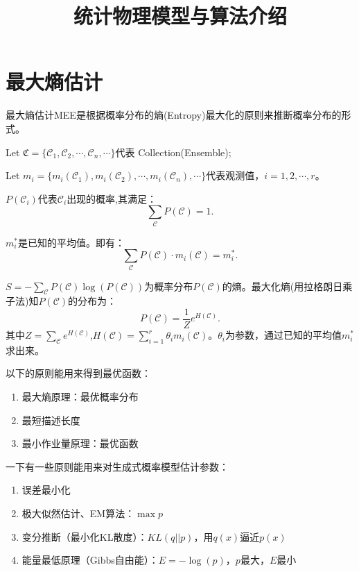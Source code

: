\documentclass[normal,cn, 11pt]{elegantnote}
\title { 统计物理模型与算法介绍 }
\date {}
\begin{document}
\maketitle

\section{最大熵估计}\label{sec:max-entro}
最大熵估计MEE是根据概率分布的熵(Entropy)最大化的原则来推断概率分布的形式。

Let $\mathfrak{C} = \{\mathcal{C}_1, \mathcal{C}_2, \cdots, \mathcal{C}_n, \cdots\}$代表 Collection(Ensemble);

Let $m_i = \{m_i(\mathcal{C}_1),m_i(\mathcal{C}_2), \cdots, m_i(\mathcal{C}_n), \cdots\}$代表观测值，$i = 1,2,\cdots,r$。

$P(\mathcal{C}_i)$代表$\mathcal{C}_i$出现的概率,其满足：
\begin{equation}\label{eq:p-sum}
  \sum\limits_{\mathcal{C}} P(\mathcal{C}) = 1.
\end{equation}

$m_i^\ast$是已知的平均值。即有：
\begin{equation}\label{eq:pingjun}
  \sum\limits_{\mathcal{C}} P(\mathcal{C})\cdot m_i(\mathcal{C}) =  m_i^\ast .
\end{equation}

$S = - \sum\limits_{\mathcal{C}}P(\mathcal{C})\log(P(\mathcal{C}))$为概率分布$P(\mathcal{C})$的熵。最大化熵(用拉格朗日乘子法)知$P(\mathcal{C})$的分布为：
\begin{equation}\label{eq:boltzmann}
  P(\mathcal{C}) = \frac{1}{Z} e^{H(\mathcal{C})}.
\end{equation}
其中$Z = \sum\limits_{\mathcal{C}}e^{H(\mathcal{C})}$,$H(\mathcal{C})=\sum_{i=1}^{r}\theta_i m_i(\mathcal{C})$。$\theta_i$为参数，通过已知的平均值$m_i^\ast$求出来。

\begin{note}
以下的原则能用来得到最优函数：
\begin{enumerate}
  \item 最大熵原理：最优概率分布
  \item 最短描述长度
  \item 最小作业量原理：最优函数
\end{enumerate}
\end{note}

\begin{note}
一下有一些原则能用来对生成式概率模型估计参数：
\begin{enumerate}
  \item 误差最小化
  \item 极大似然估计、EM算法：$\max p$
  \item 变分推断（最小化KL散度）：$KL(q||p)$，用$q(x)$逼近$p(x)$
  \item 能量最低原理（Gibbs自由能）：$E= -\log(p)$，$p$最大，$E$最小
\end{enumerate}
\end{note}
\end{document}
